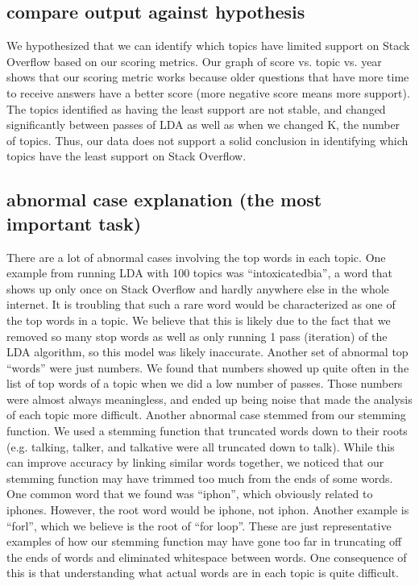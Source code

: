 \subsection{compare output against hypothesis}
We hypothesized that we can identify which topics have limited support on Stack Overflow based on our scoring metrics. Our graph of score vs. topic vs. year shows that our scoring metric works because older questions that have more time to receive answers have a better score (more negative score means more support). The topics identified as having the least support are not stable, and changed significantly between passes of LDA as well as when we changed K, the number of topics. Thus, our data does not support a solid conclusion in identifying which topics have the least support on Stack Overflow.

\subsection{abnormal case explanation (the most important task)}
There are a lot of abnormal cases involving the top words in each topic. One example from running LDA with 100 topics was “intoxicatedbia”, a word that shows up only once on Stack Overflow and hardly anywhere else in the whole internet. It is troubling that such a rare word would be characterized as one of the top words in a topic. We believe that this is likely due to the fact that we removed so many stop words as well as only running 1 pass (iteration) of the LDA algorithm, so this model was likely inaccurate.
Another set of abnormal top “words” were just numbers. We found that numbers showed up quite often in the list of top words of a topic when we did a low number of passes. Those numbers were almost always meaningless, and ended up being noise that made the analysis of each topic more difficult. 
Another abnormal case stemmed from our stemming function. We used a stemming function that truncated words down to their roots (e.g. talking, talker, and talkative were all truncated down to talk). While this can improve accuracy by linking similar words together, we noticed that our stemming function may have trimmed too much from the ends of some words. One common word that we found was “iphon”, which obviously related to iphones. However, the root word would be iphone, not iphon. Another example is “forl”, which we believe is the root of “for loop”. These are just representative examples of how our stemming function may have gone too far in truncating off the ends of words and eliminated whitespace between words. One consequence of this is that understanding what actual words are in each topic is quite difficult.

